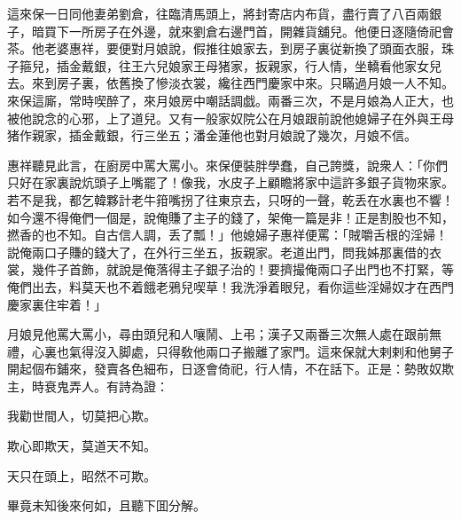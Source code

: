 這來保一日同他妻弟劉倉，往臨清馬頭上，將封寄店内布貨，盡行賣了八百兩銀子，暗買下一所房子在外邊，就來劉倉右邊門首，開雜貨舖兒。他便日逐隨倚祀會茶。他老婆惠祥，要便對月娘說，假推往娘家去，到房子裏従新換了頭面衣服，珠子箍兒，插金戴銀，往王六兒娘家王母猪家，扳親家，行人情，坐轎看他家女兒去。來到房子裏，依舊換了慘淡衣裳，纔往西門慶家中來。只瞞過月娘一人不知。來保這廝，常時喫醉了，來月娘房中嘲話調戯。兩番三次，不是月娘為人正大，也被他說念的心邪，上了道兒。又有一般家奴院公在月娘跟前說他媳婦子在外與王母猪作親家，插金戴銀，行三坐五；潘金蓮他也對月娘說了幾次，月娘不信。

惠祥聽見此言，在廚房中罵大罵小。來保便裝胖學蠢，自己誇獎，說衆人：「你們只好在家裏說炕頭子上嘴罷了！像我，水皮子上顧瞻將家中這許多銀子貨物來家。若不是我，都乞韓夥計老牛箝嘴拐了往東京去，只呀的一聲，乾丢在水裏也不響！如今還不得俺們一個是，說俺賺了主子的錢了，架俺一篇是非！正是割股也不知，撚香的也不知。自古信人調，丢了瓢！」他媳婦子惠祥便罵：「賊嚼舌根的淫婦！説俺兩口子賺的錢大了，在外行三坐五，扳親家。老道出門，問我姊那裏借的衣裳，幾件子首飾，就說是俺落得主子銀子治的！要擠撮俺兩口子出門也不打緊，等俺們出去，料莫天也不着餓老鴉兒喫草！我洗淨着眼兒，看你這些淫婦奴才在西門慶家裏住牢着！」

月娘見他罵大罵小，尋由頭兒和人嚷鬧、上弔；漢子又兩番三次無人處在跟前無禮，心裏也氣得沒入脚處，只得敎他兩口子搬離了家門。這來保就大剌剌和他舅子開起個布鋪來，發賣各色細布，日逐會倚祀，行人情，不在話下。正是：勢敗奴欺主，時衰鬼弄人。有詩為證：

\begin{myquote}
我勸世間人，切莫把心欺。

欺心即欺天，莫道天不知。

天只在頭上，昭然不可欺。
\end{myquote}

畢竟未知後來何如，且聽下囬分解。

